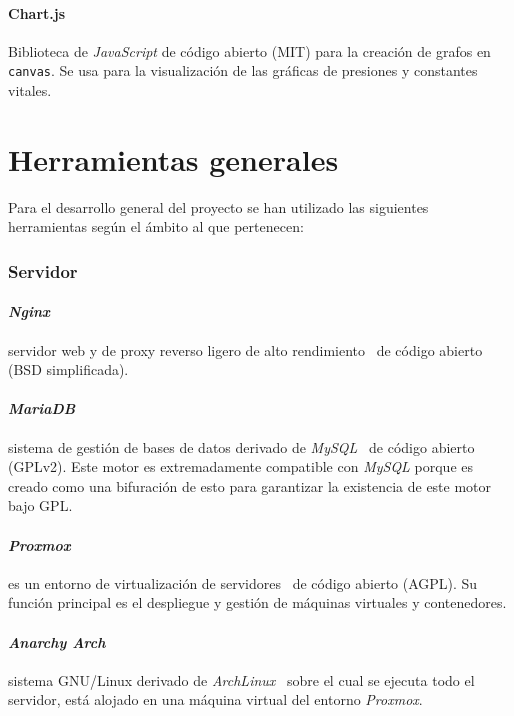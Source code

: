 \paragraph{Chart.js}Biblioteca de \textit{JavaScript} de código abierto (MIT) para la creación de grafos en \texttt{canvas}. Se usa para la visualización de las gráficas de presiones y constantes vitales.

\section{Herramientas generales}

Para el desarrollo general del proyecto se han utilizado las siguientes herramientas según el ámbito al que pertenecen:

\subsubsection{Servidor}
\paragraph{\textit{Nginx}}servidor web y de proxy reverso ligero de alto rendimiento~\cite{wiki:nginx} de código abierto (BSD simplificada).
\paragraph{\textit{MariaDB}}sistema de gestión de bases de datos derivado de \textit{MySQL}~\cite{wiki:mariadb} de código abierto (GPLv2). Este motor es extremadamente compatible con \textit{MySQL} porque es creado como una bifuración de esto para garantizar la existencia de este motor bajo GPL.
\paragraph{\textit{Proxmox}}es un entorno de virtualización de servidores~\cite{wiki:proxmox} de código abierto (AGPL). Su función principal es el despliegue y gestión de máquinas virtuales y contenedores.
\paragraph{\textit{Anarchy Arch}}sistema GNU/Linux derivado de \textit{ArchLinux}~\cite{wiki:arch} sobre el cual se ejecuta todo el servidor, está alojado en una máquina virtual del entorno \textit{Proxmox}.

